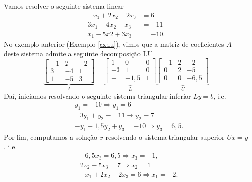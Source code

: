 \begin{ex}\label{ex:lu}
  Vamos resolver o seguinte sistema linear
  \begin{align}
    -x_1 + 2x_2 - 2x_3 &= 6\\
    3x_1 - 4x_2 + x_3 &= -11\\
    x_1 - 5x2 + 3x_3 &= -10.
  \end{align}
  No exemplo anterior (Exemplo \ref{ex:lu}), vimos que a matriz de coeficientes $A$ deste sistema admite a seguinte decomposição LU
  \begin{equation}
    \underbrace{\begin{bmatrix}
      -1 & 2 & -2\\
      3 & -4 & 1\\
      1 & -5 & 3
    \end{bmatrix}}_{A} =
  \underbrace{\begin{bmatrix}
      1 & 0 & 0\\
      -3 & 1 & 0\\
      -1 & -1,5 & 1
    \end{bmatrix}}_{L}
  \underbrace{\begin{bmatrix}
      -1 & 2 & -2\\
      0 & 2 & -5\\
      0 & 0 & -6,5
    \end{bmatrix}}_{U}
  \end{equation}
  Daí, iniciamos resolvendo o seguinte sistema triangular inferior $Ly = b$, i.e.
  \begin{align}
    &y_1 = -10 \Rightarrow y_1 = 6\\
    &-3y_1 + y_2 = -11 \Rightarrow y_2 = 7\\
    &-y_1 - 1,5y_2 + y_3 = -10 \Rightarrow y_3 = 6,5.
  \end{align}
  Por fim, computamos a solução $x$ resolvendo o sistema triangular superior $Ux=y$, i.e.
  \begin{align}
    &-6,5x_3 = 6,5 \Rightarrow x_3 = -1,\\
    &2x_2 - 5x_3 = 7 \Rightarrow x_2 = 1\\
    &-x_1 + 2x_2 - 2x_3 = 6 \Rightarrow x_1 = -2.
  \end{align}

% 
\end{ex}


